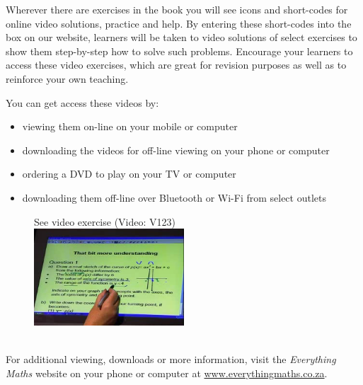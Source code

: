 {\Large

Wherever there are exercises in the book you will see icons and short-codes for online video solutions,
practice and help. By entering these short-codes into the box on our website, learners will be taken to video solutions of select exercises to show them
step-by-step how to solve such problems. Encourage your learners to access these video exercises, which are great for revision purposes as well as to reinforce your own teaching.\par

You can get access these videos by:
\begin{itemize}[noitemsep]
    \item viewing them on-line on your mobile or computer
    \item downloading the videos for off-line viewing on your phone or computer
    \item ordering a DVD to play on your TV or computer
    \item downloading them off-line over Bluetooth or Wi-Fi from select outlets
\end{itemize}


\begin{figure}[H]
\begin{center}
See video exercise  (Video: V123)\\ 
\includegraphics[width=0.5\textwidth]{../title_images/mindsetexercise.png}
\end{center}
\end{figure}
\\
For additional viewing, downloads or more information, visit the \textit{Everything Maths} website on your phone or computer at \underline{www.everythingmaths.co.za}.\par


\vspace*{1cm}
}



